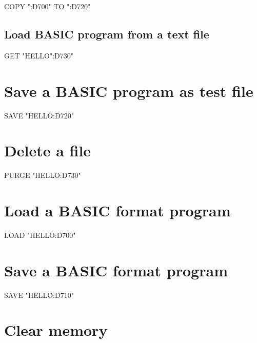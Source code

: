 \begin{DoxyPre}
  COPY ":D700" TO ":D720"\end{DoxyPre}



\begin{DoxyPre}\section*{Load BASIC program from a text file}\end{DoxyPre}



\begin{DoxyPre}
  GET "HELLO":D730"
\section*{Save a BASIC program as test file}\end{DoxyPre}



\begin{DoxyPre}
  SAVE "HELLO:D720"
\section*{Delete a file}\end{DoxyPre}



\begin{DoxyPre}
  PURGE "HELLO:D730"
\section*{Load a BASIC format program}\end{DoxyPre}



\begin{DoxyPre}
  LOAD "HELLO:D700"
\section*{Save a BASIC format program}\end{DoxyPre}



\begin{DoxyPre}
  SAVE "HELLO:D710"
\section*{Clear memory}\end{DoxyPre}



